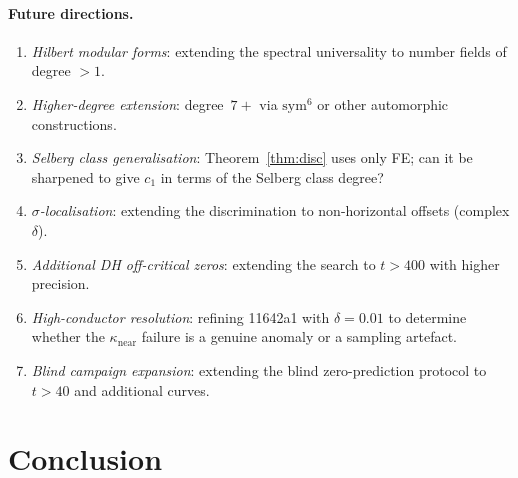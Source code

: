 \documentclass[11pt, a4paper]{article}
\theoremstyle{plain}
\theoremstyle{definition}
\begin{document}
\paragraph{Future directions.}
\begin{enumerate}
  \item \textit{Hilbert modular forms}: extending the spectral universality
        to number fields of degree $>1$.
  \item \textit{Higher-degree extension}: degree~$7+$ via
        $\mathrm{sym}^{6}$ or other automorphic constructions.
  \item \textit{Selberg class generalisation}: Theorem~\ref{thm:disc}
        uses only FE; can it be sharpened to give $c_{1}$ in terms of
        the Selberg class degree?
  \item \textit{$\sigma$-localisation}: extending the discrimination to
        non-horizontal offsets (complex $\delta$).
  \item \textit{Additional DH off-critical zeros}: extending the search
        to $t>400$ with higher precision.
  \item \textit{High-conductor resolution}: refining 11642a1 with
        $\delta=0.01$ to determine whether the $\kappa_{\mathrm{near}}$
        failure is a genuine anomaly or a sampling artefact.
  \item \textit{Blind campaign expansion}: extending the blind
        zero-prediction protocol to $t>40$ and additional curves.
\end{enumerate}


\section{Conclusion}
\label{sec:conclusion}
\end{document}
